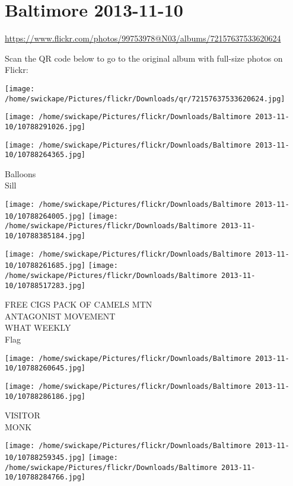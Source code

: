 \documentclass[10pt,letterpaper]{article}
\title{}
\author{}
\date{}
\begin{document}
\section*{Baltimore 2013-11-10}

\url{https://www.flickr.com/photos/99753978@N03/albums/72157637533620624}

Scan the QR code below to go to the original album with full-size photos on Flickr:

\texttt{[image: /home/swickape/Pictures/flickr/Downloads/qr/72157637533620624.jpg]}
\pagebreak

\texttt{[image: /home/swickape/Pictures/flickr/Downloads/Baltimore 2013-11-10/10788291026.jpg]}

\vspace{0.25in}
\texttt{[image: /home/swickape/Pictures/flickr/Downloads/Baltimore 2013-11-10/10788264365.jpg]}

Balloons\\
Sill
\pagebreak

\texttt{[image: /home/swickape/Pictures/flickr/Downloads/Baltimore 2013-11-10/10788264005.jpg]}
\texttt{[image: /home/swickape/Pictures/flickr/Downloads/Baltimore 2013-11-10/10788385184.jpg]}

\texttt{[image: /home/swickape/Pictures/flickr/Downloads/Baltimore 2013-11-10/10788261685.jpg]}
\texttt{[image: /home/swickape/Pictures/flickr/Downloads/Baltimore 2013-11-10/10788517283.jpg]}

FREE CIGS PACK OF CAMELS MTN\\
ANTAGONIST MOVEMENT\\
WHAT WEEKLY\\
Flag
\pagebreak

\texttt{[image: /home/swickape/Pictures/flickr/Downloads/Baltimore 2013-11-10/10788260645.jpg]}

\vspace{0.25in}
\texttt{[image: /home/swickape/Pictures/flickr/Downloads/Baltimore 2013-11-10/10788286186.jpg]}

VISITOR\\
MONK
\pagebreak

\texttt{[image: /home/swickape/Pictures/flickr/Downloads/Baltimore 2013-11-10/10788259345.jpg]}
\texttt{[image: /home/swickape/Pictures/flickr/Downloads/Baltimore 2013-11-10/10788284766.jpg]}
\end{document}
